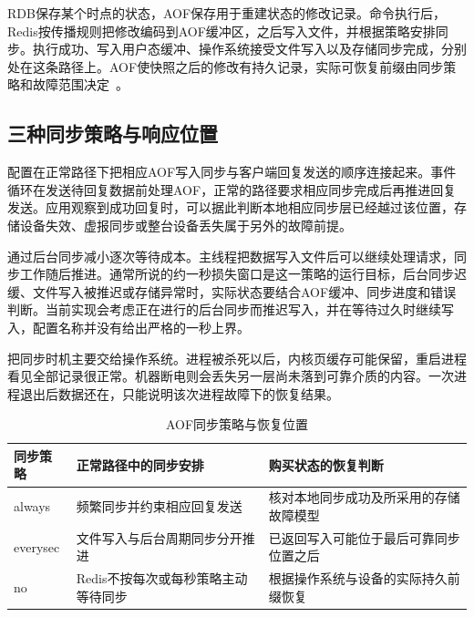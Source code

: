 RDB保存某个时点的状态，AOF保存用于重建状态的修改记录。命令执行后，Redis按传播规则把修改编码到AOF缓冲区，之后写入文件，并根据策略安排同步。执行成功、写入用户态缓冲、操作系统接受文件写入以及存储同步完成，分别处在这条路径上。AOF使快照之后的修改有持久记录，实际可恢复前缀由同步策略和故障范围决定~\cite{redis8102-persistence,redis8102-source}。

\subsection{三种同步策略与响应位置}

配置在正常路径下把相应AOF写入同步与客户端回复发送的顺序连接起来。事件循环在发送待回复数据前处理AOF，正常的路径要求相应同步完成后再推进回复发送。应用观察到成功回复时，可以据此判断本地相应同步层已经越过该位置，存储设备失效、虚报同步或整台设备丢失属于另外的故障前提。

通过后台同步减小逐次等待成本。主线程把数据写入文件后可以继续处理请求，同步工作随后推进。通常所说的约一秒损失窗口是这一策略的运行目标，后台同步迟缓、文件写入被推迟或存储异常时，实际状态要结合AOF缓冲、同步进度和错误判断。当前实现会考虑正在进行的后台同步而推迟写入，并在等待过久时继续写入，配置名称并没有给出严格的一秒上界。

把同步时机主要交给操作系统。进程被杀死以后，内核页缓存可能保留，重启进程看见全部记录很正常。机器断电则会丢失另一层尚未落到可靠介质的内容。一次进程退出后数据还在，只能说明该次进程故障下的恢复结果。


\begin{table}[htbp]
\centering\small
\caption{AOF同步策略与恢复位置}\label{tab:18-aof-policy}
\begin{tabularx}{\linewidth}{@{}p{.14\linewidth}XX@{}}
\toprule
同步策略 & 正常路径中的同步安排 & 购买状态的恢复判断\\
\midrule
{\ttfamily always} & 频繁同步并约束相应回复发送 & 核对本地同步成功及所采用的存储故障模型\\
{\ttfamily everysec} & 文件写入与后台周期同步分开推进 & 已返回写入可能位于最后可靠同步位置之后\\
{\ttfamily no} & Redis不按每次或每秒策略主动等待同步 & 根据操作系统与设备的实际持久前缀恢复\\
\bottomrule
\end{tabularx}
\end{table}

